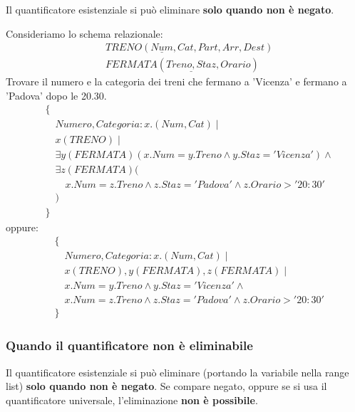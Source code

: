 \documentclass[a4paper,twoside]{article}
\begin{document}
\vspace{1em}
\noindent
Il quantificatore esistenziale si può eliminare \textbf{solo quando non è negato}.

\begin{example}
  Consideriamo lo schema relazionale:
  \[
    \begin{aligned}
      &TRENO(\underline{Num}, Cat, Part, Arr, Dest)\\
      &FERMATA(\underline{Treno, Staz}, Orario)
    \end{aligned}
  \] 
  Trovare il numero e la categoria dei treni che fermano a 'Vicenza' e fermano
  a 'Padova' dopo le 20.30.
  \[
    \begin{aligned}
      &\{\\
      &\quad Numero, Categoria: x.(Num, Cat) \mid \\
      &\quad x(TRENO) \mid \\
      &\quad \exists y(FERMATA)(
      x.Num = y.Treno \land y.Staz = 'Vicenza'
      ) \land\\
      &\quad \exists z(FERMATA)(\\
      &\quad \quad x.Num = z.Treno \land z.Staz = 'Padova' \land z.Orario > '20:30'\\
      &\quad)\\
      &\}
    \end{aligned}
  \] 
  oppure:
  \[
    \begin{aligned}
      &\{\\
      &\quad Numero, Categoria: x.(Num, Cat) \mid \\
      &\quad x(TRENO), y(FERMATA), z(FERMATA) \mid \\
      &\quad x.Num = y.Treno \land y.Staz = 'Vicenza' \land \\
      &\quad x.Num = z.Treno \land z.Staz = 'Padova' \land z.Orario > '20:30'\\
      &\}
    \end{aligned}
  \] 
\end{example}

\subsubsection{Quando il quantificatore non è eliminabile}
Il quantificatore esistenziale si può eliminare (portando la variabile nella range list)
\textbf{solo quando non è negato}. Se compare negato, oppure se si usa il quantificatore
universale, l'eliminazione \textbf{non è possibile}.
\end{document}
